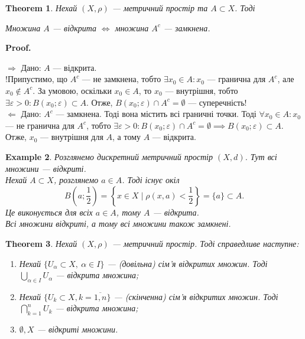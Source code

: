 \documentclass[a4paper, 10pt]{article}
\makeatletter
\def\rightproof{$\boxed{\Rightarrow}$ }
\def\leftproof{$\boxed{\Leftarrow}$ }
\theoremstyle{theoremdd}
\newtheorem{theorem}{Theorem}[subsection]
\theoremstyle{theoremdd}
\theoremstyle{theoremdd}
\theoremstyle{theoremdd}
\newtheorem{example}[theorem]{Example}
\theoremstyle{theoremdd}
\theoremstyle{theoremdd}
\theoremstyle{theoremdd}
\theoremstyle{theoremdd}
\renewenvironment{proof}[1][Proof.\\]{\par
\pushQED{\hfill \qed}%
\normalfont \topsep6\p@\@plus6\p@\relax
\trivlist
\item\relax
{\bfseries
#1\@addpunct{.}}\hspace\labelsep\ignorespaces
}{%
\popQED\endtrivlist\@endpefalse
}
\makeatother
\begin{document}
\begin{theorem}
\label{set_open_iff_complement_set_closed}
Нехай $(X,\rho)$ --- метричний простір та $A \subset X$. Тоді
\begin{center}
Множина $A$ --- відкрита $\iff$ множина $A^c$ --- замкнена.
\end{center}
\end{theorem}

\begin{proof}
\rightproof Дано: $A$ --- відкрита.\\
!Припустимо, що $A^c$ --- не замкнена, тобто $\exists x_0 \in A: x_0$ --- гранична для $A^c$, але $x_0 \notin A^c$. За умовою, оскільки $x_0 \in A$, то $x_0$ --- внутрішня, тобто $\exists \varepsilon > 0: B(x_0;\varepsilon) \subset A$. Отже, $B(x_0;\varepsilon) \cap A^c = \emptyset$ --- суперечність!
\bigskip \\
\leftproof Дано: $A^c$ --- замкнена. Тоді вона містить всі граничні точки. Тоді $\forall x_0 \in A: x_0$ --- не гранична для $A^c$, тобто $\exists \varepsilon > 0: B(x_0;\varepsilon) \cap A^c = \emptyset \implies B(x_0;\varepsilon) \subset A$. Отже, $x_0$ --- внутрішня для $A$, а тому $A$ --- відкрита.
\end{proof}

\begin{example}
Розглянемо дискретний метричний простір $(X,d)$. Тут всі множини --- відкриті.
\bigskip \\
Нехай $A \subset X$, розглянемо $a \in A$. Тоді існує окіл 
\[
B\left(a;\dfrac{1}{2}\right) = \left\{ x \in X \mid \rho(x,a) < \dfrac{1}{2} \right\} = \{a\} \subset A.
\]
Це виконується для всіх $a \in A$, тому $A$ --- відкрита.\\
Всі множини відкриті, а тому всі множини також замкнені.
\end{example}

\begin{theorem} 
Нехай $(X,\rho)$ --- метричний простір. Тоді справедливе наступне:
\begin{enumerate}[nosep,wide=0pt,label={\arabic*)}]
\item Нехай $\{U_{\alpha} \subset X,\ \alpha \in I\}$ --- (довільна) сім'я відкритих множин. Тоді $\displaystyle \bigcup_{\alpha \in I} U_{\alpha}$ --- відкрита множина;
\item Нехай $\{U_k \subset X, k = \overline{1,n}\}$ --- (скінченна) сім'я відкритих множин. Тоді $\displaystyle \bigcap_{k=1}^n U_k$ --- відкрита множина;
\item $\emptyset, X$ --- відкриті множини.
\end{enumerate}
\end{theorem}
\end{document}
